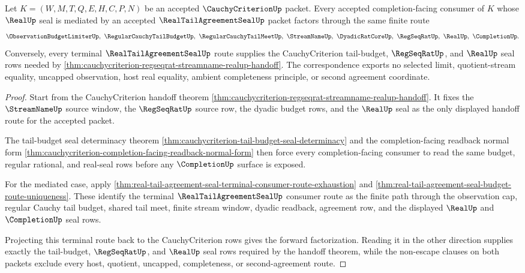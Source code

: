 \begin{theorem}
\label{thm:cauchycriterion-real-tail-agreement-seal-route-correspondence}
Let $K=(W,M,T,Q,E,H,C,P,N)$ be an accepted $\CauchyCriterionUp$
packet. Every accepted completion-facing consumer of $K$ whose $\RealUp$
seal is mediated by an accepted $\RealTailAgreementSealUp$ packet factors
through the same finite route
$$
\ObservationBudgetLimiterUp,\ \RegularCauchyTailBudgetUp,\
\RegularCauchyTailMeetUp,\ \StreamNameUp,\ \DyadicRatCoreUp,\
\RegSeqRatUp,\ \RealUp,\ \CompletionUp.
$$
Conversely, every terminal $\RealTailAgreementSealUp$ route supplies the
CauchyCriterion tail-budget, $\RegSeqRatUp$, and $\RealUp$ seal rows needed
by \autoref{thm:cauchycriterion-regseqrat-streamname-realup-handoff}. The
correspondence exports no selected limit, quotient-stream equality,
uncapped observation, host real equality, ambient completeness principle, or
second agreement coordinate.
\end{theorem}
\begin{proof}
Start from the CauchyCriterion handoff theorem
\autoref{thm:cauchycriterion-regseqrat-streamname-realup-handoff}. It fixes
the $\StreamNameUp$ source window, the $\RegSeqRatUp$ source row, the dyadic
budget rows, and the $\RealUp$ seal as the only displayed handoff route for
the accepted packet.

The tail-budget seal determinacy theorem
\autoref{thm:cauchycriterion-tail-budget-seal-determinacy} and the
completion-facing readback normal form
\autoref{thm:cauchycriterion-completion-facing-readback-normal-form} then
force every completion-facing consumer to read the same budget, regular
rational, and real-seal rows before any $\CompletionUp$ surface is exposed.

For the mediated case, apply
\autoref{thm:real-tail-agreement-seal-terminal-consumer-route-exhaustion}
and \autoref{thm:real-tail-agreement-seal-budget-route-uniqueness}. These
identify the terminal $\RealTailAgreementSealUp$ consumer route as the
finite path through the observation cap, regular Cauchy tail budget,
shared tail meet, finite stream window, dyadic readback, agreement row, and
the displayed $\RealUp$ and $\CompletionUp$ seal rows.

Projecting this terminal route back to the CauchyCriterion rows gives the
forward factorization. Reading it in the other direction supplies exactly
the tail-budget, $\RegSeqRatUp$, and $\RealUp$ seal rows required by the
handoff theorem, while the non-escape clauses on both packets exclude every
host, quotient, uncapped, completeness, or second-agreement route.
\end{proof}

